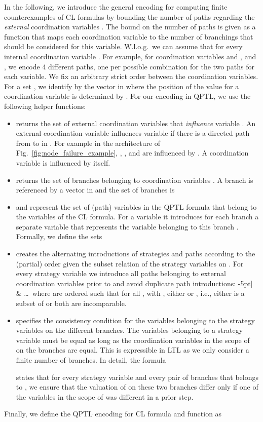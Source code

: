 \documentclass{LMCS}
\theoremstyle{plain}\newtheorem{theorem}[thm]{Theorem}
\theoremstyle{plain}\newtheorem{lemma}[thm]{Lemma}
\theoremstyle{plain}\newtheorem{proposition}[thm]{Proposition}
\theoremstyle{plain}\newtheorem{corollary}[thm]{Corollary}
\theoremstyle{definition}\newtheorem{definition}{Definition}[section]
\begin{document}
In the following, we introduce the general encoding for computing finite counterexamples of CL formulas  by bounding the number of paths regarding the \emph{external} coordination variables .
The bound on the number of paths is given as a function  that maps each coordination variable to the number of branchings that should be considered for this variable.
W.l.o.g.\ we can assume that  for every internal coordination variable .
For example, for coordination variables  and , and  , we encode 4 different paths, one per possible combination for the two paths for each variable.
We fix an arbitrary strict order  between the coordination variables.
For a set , we identify  by the vector in  where the position of the value  for a coordination variable  is determined by .
For our encoding in QPTL, we use the following helper functions:
\begin{itemize}
  \item  returns the set of external coordination variables that \emph{influence} variable .
    An external coordination variable  influences variable  if there is a directed path from  to  in .
    For example in the architecture of Fig.~\ref{fig:node_failure_example}, , , and  are influenced by .
    A coordination variable is influenced by itself.
  
  \item  returns the set of branches belonging to coordination variables .
    A branch  is referenced by a vector in  and the set of branches is
    
  
  \item  and  represent the set of (path) variables in the QPTL formula that belong to the variables of the CL formula.
    For a variable  it introduces for each branch  a separate variable  that represents the variable  belonging to this branch .
    Formally, we define the sets
      
  
  \item  creates the alternating introductions of strategies and paths according to the (partial) order given the subset relation of the strategy variables on .
    For every strategy variable  we introduce all paths belonging to external coordination variables  prior to  and avoid duplicate path introductions: 
    -5pt]
      & \dots \
    where  are ordered such that for all ,  with , either  or , i.e., either  is a subset of  or both are incomparable.
    
   \item  specifies the consistency condition for the variables belonging to the strategy variables on the different branches.
    The variables  belonging to a strategy variable  must be equal as long as the coordination variables in the scope of  on the branches  are equal.
    This is expressible in LTL as we only consider a finite number of branches.
    In detail, the formula
    
    states that for every strategy variable  and every pair of branches  that belongs to , we ensure that the valuation of  on these two branches differ only if one of the variables in the scope of  was different in a prior step.
   
\end{itemize}
Finally, we define the QPTL encoding for CL formula  and function  as
\end{document}
